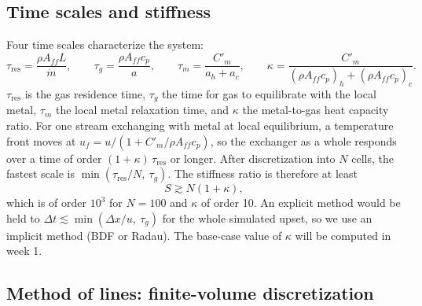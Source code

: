 \documentclass[11pt]{article}
\begin{document}
\subsection{Time scales and stiffness}

Four time scales characterize the system:
\begin{equation}
  \tau_{\mathrm{res}} = \frac{\rho A_{ff} L}{\dot m},
  \qquad
  \tau_g = \frac{\rho A_{ff} c_p}{a},
  \qquad
  \tau_m = \frac{C'_m}{a_h + a_c},
  \qquad
  \kappa = \frac{C'_m}{(\rho A_{ff} c_p)_h + (\rho A_{ff} c_p)_c}.
\end{equation}
$\tau_{\mathrm{res}}$ is the gas residence time, $\tau_g$ the time for gas to equilibrate with the local metal, $\tau_m$ the local metal relaxation time, and $\kappa$ the metal-to-gas heat capacity ratio. For one stream exchanging with metal at local equilibrium, a temperature front moves at $u_f = u/(1 + C'_m/\rho A_{ff} c_p)$, so the exchanger as a whole responds over a time of order $(1+\kappa)\,\tau_{\mathrm{res}}$ or longer. After discretization into $N$ cells, the fastest scale is $\min(\tau_{\mathrm{res}}/N,\ \tau_g)$. The stiffness ratio is therefore at least
\begin{equation}
  S \gtrsim N(1 + \kappa),
\end{equation}
which is of order $10^3$ for $N = 100$ and $\kappa$ of order 10. An explicit method would be held to $\Delta t \lesssim \min(\Delta x/u,\ \tau_g)$ for the whole simulated upset, so we use an implicit method (BDF or Radau). The base-case value of $\kappa$ will be computed in week 1.

\subsection{Method of lines: finite-volume discretization}
\end{document}
